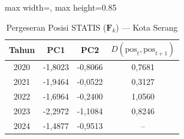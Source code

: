 \begin{table}[H]
\centering
\caption{Pergeseran Posisi STATIS ($\mathbf{F}_k$) --- Kota Serang} \label{tab:app2jarak_statis_skor_kota_serang}
\begin{adjustbox}{max width=\textwidth, max height=0.85\textheight}
\begin{tabular}{|c|c|c|c|}
\hline
\textbf{Tahun} & \textbf{PC1} & \textbf{PC2} & \textbf{$D(\text{pos}_t, \text{pos}_{t+1})$} \\
\hline
2020 & -1,8023 & -0,8066 & 0,7681 \\
2021 & -1,9464 & -0,0522 & 0,3127 \\
2022 & -1,6964 & -0,2400 & 1,0560 \\
2023 & -2,2972 & -1,1084 & 0,8246 \\
2024 & -1,4877 & -0,9513 & -- \\
\hline
\end{tabular}
\end{adjustbox}
\end{table}